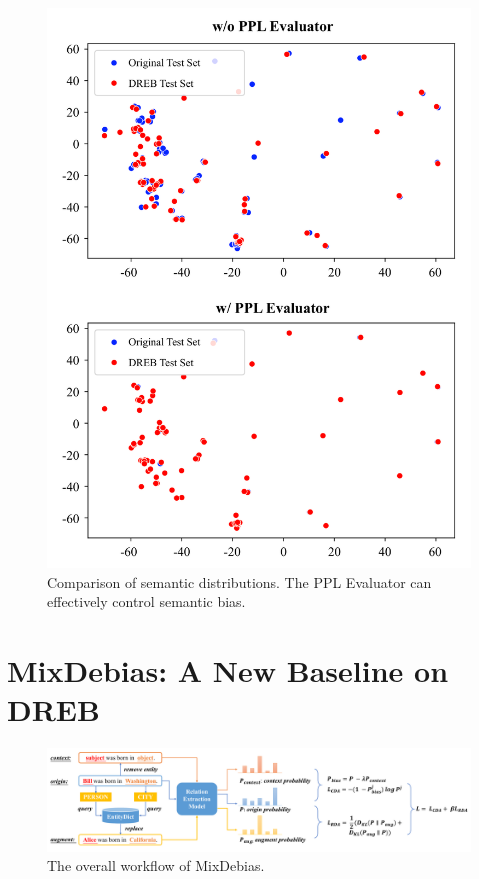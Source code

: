 \documentclass[letterpaper]{article} %
\begin{document}
\begin{figure}[ht]
    \centering
    \includegraphics[width=\linewidth]{figure/semantic_bias.pdf}
    \caption{Comparison of semantic distributions. The PPL Evaluator can effectively control semantic bias.}
    \label{fig:semantic_bias}
\end{figure}





\section{MixDebias: A New Baseline on DREB}

\begin{figure}[ht]
    \centering
    \includegraphics[width=\linewidth]{figure/mixdebias.pdf}
    \caption{The overall workflow of MixDebias.}
    \label{fig:mixdebias}
\end{figure}
\end{document}
